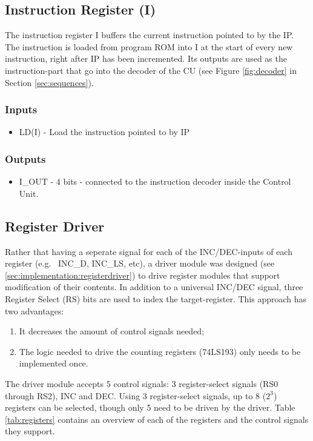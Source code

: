 \subsection{Instruction Register (I)} \label{sec:architecture:i}
The instruction register I buffers the current instruction pointed to by the IP. The instruction is loaded from program ROM into I at the start of every new instruction, right after IP has been incremented. Its outputs are used as the instruction-part that go into the decoder of the CU (see Figure \ref{fig:decoder} in Section \ref{sec:sequences}).


\subsubsection*{Inputs}
\begin{itemize}
\itemsep0em 
\item LD(I) - Load the instruction pointed to by IP
\end{itemize}

\subsubsection*{Outputs}
\begin{itemize}
\itemsep0em 
\item I\_OUT - 4 bits - connected to the instruction decoder inside the Control Unit.
\end{itemize}


\subsection{Register Driver} \label{sec:architecture:registerdriver}
Rather that having a seperate signal for each of the INC/DEC-inputs of each register (e.g.~ INC\_D, INC\_LS, etc), a driver module was designed (see \ref{sec:implementation:registerdriver}) to drive register modules that support modification of their contents. In addition to a universal INC/DEC signal, three Register Select (RS) bits are used to index the target-register. This approach has two advantages:
\begin{enumerate}
\item It decreases the amount of control signals needed;
\item The logic needed to drive the counting registers (74LS193) only needs to be implemented once.
\end{enumerate}

The driver module accepts 5 control signals: 3 register-select signals (RS0 through RS2), INC and DEC. Using 3 register-select signals, up to 8 ($2^3$) registers can be selected, though only 5 need to be driven by the driver. Table \ref{tab:registers} contains an overview of each of the registers and the control signals they support.

